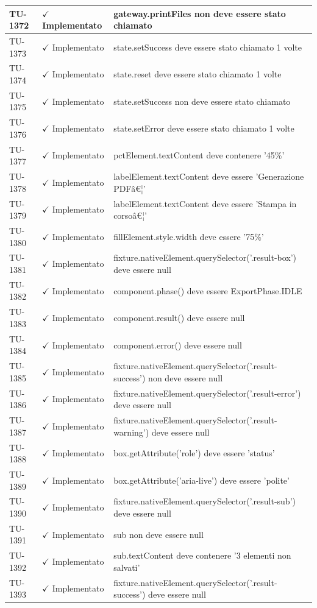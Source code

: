 ﻿\documentclass[a4paper,12pt]{article}
\newcommand{\ok}{\textcolor{green!60!black}{$\checkmark$ Implementato}}
\begin{document}
\begin{longtable}{|p{2cm}|p{3.5cm}|p{9.5cm}|}
\hline
TU-1372 & \ok & gateway.printFiles non deve essere stato chiamato \\
\hline
TU-1373 & \ok & state.setSuccess deve essere stato chiamato 1 volte \\
\hline
TU-1374 & \ok & state.reset deve essere stato chiamato 1 volte \\
\hline
TU-1375 & \ok & state.setSuccess non deve essere stato chiamato \\
\hline
TU-1376 & \ok & state.setError deve essere stato chiamato 1 volte \\
\hline
TU-1377 & \ok & pctElement.textContent deve contenere '45\%' \\
\hline
TU-1378 & \ok & labelElement.textContent deve essere 'Generazione PDFâ€¦' \\
\hline
TU-1379 & \ok & labelElement.textContent deve essere 'Stampa in corsoâ€¦' \\
\hline
TU-1380 & \ok & fillElement.style.width deve essere '75\%' \\
\hline
TU-1381 & \ok & fixture.nativeElement.querySelector('.result-box') deve essere null \\
\hline
TU-1382 & \ok & component.phase() deve essere ExportPhase.IDLE \\
\hline
TU-1383 & \ok & component.result() deve essere null \\
\hline
TU-1384 & \ok & component.error() deve essere null \\
\hline
TU-1385 & \ok & fixture.nativeElement.querySelector('.result-success') non deve essere null \\
\hline
TU-1386 & \ok & fixture.nativeElement.querySelector('.result-error') deve essere null \\
\hline
TU-1387 & \ok & fixture.nativeElement.querySelector('.result-warning') deve essere null \\
\hline
TU-1388 & \ok & box.getAttribute('role') deve essere 'status' \\
\hline
TU-1389 & \ok & box.getAttribute('aria-live') deve essere 'polite' \\
\hline
TU-1390 & \ok & fixture.nativeElement.querySelector('.result-sub') deve essere null \\
\hline
TU-1391 & \ok & sub non deve essere null \\
\hline
TU-1392 & \ok & sub.textContent deve contenere '3 elementi non salvati' \\
\hline
TU-1393 & \ok & fixture.nativeElement.querySelector('.result-success') deve essere null \\

\end{longtable}
\end{document}
